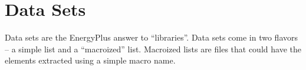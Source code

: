 \chapter{Data Sets}\label{data-sets}

Data sets are the EnergyPlus answer to ``libraries''. Data sets come in two flavors -- a simple list and a ``macroized'' list. Macroized lists are files that could have the elements extracted using a simple macro name.
